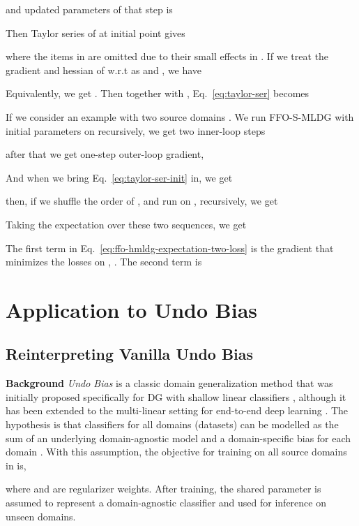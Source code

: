 \documentclass[runningheads]{llncs}
\newcommand{\nameS}{S-MLDG}
\newcommand{\keypoint}[1]{\vspace{0.1cm}\noindent\textbf{#1}\quad}
\begin{document}
\normalsize
and updated parameters of that step is
\small

\normalsize
Then Taylor series of  at initial point  gives 
\small

\normalsize
where the  items in  are omitted due to their small effects in . If we treat the gradient and hessian of  w.r.t  as  and , we have 
\small

\normalsize
Equivalently, we get . Then together with , Eq.~\ref{eq:taylor-ser} becomes

\small

\normalsize
If we consider an example with two source domains . We run FFO-\nameS{} with initial parameters  on  recursively, we get two inner-loop steps
\small

\normalsize
after that we get one-step outer-loop gradient,
\small

\normalsize
And when we bring Eq.~\ref{eq:taylor-ser-init} in, we get
\small

\normalsize
then, if we shuffle the order of ,  and run on ,  recursively, we get
\small

\normalsize

\noindent Taking the expectation over these two sequences, we get
\small

\normalsize
The first term  in Eq.~\ref{eq:ffo-hmldg-expectation-two-loss} is the gradient that minimizes the losses on , . The second term is
\small

\normalsize


\section{Application to Undo Bias}\label{appendix:sec:undo}
\subsection{Reinterpreting Vanilla Undo Bias}
\keypoint{Background}
\emph{Undo Bias} is a classic domain generalization method that was initially proposed specifically for DG with shallow linear classifiers \cite{ECCV12_Khosla}, although it has been extended to the multi-linear setting for end-to-end deep learning \cite{da2017dg}. The hypothesis is that classifiers for all domains (datasets) can be modelled as the sum of an underlying domain-agnostic model  and a domain-specific bias  for each domain . With this assumption, the objective for training on all  source domains in  is,
\small

\normalsize
where  and  are regularizer weights.
After training, the shared parameter  is assumed to represent a domain-agnostic classifier and used for inference on unseen domains.
\end{document}
